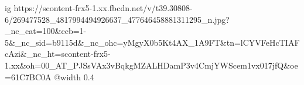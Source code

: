  
 
 
 
 

\ifcmt
  ig https://scontent-frx5-1.xx.fbcdn.net/v/t39.30808-6/269477528_4817994494926637_477646458881311295_n.jpg?_nc_cat=100&ccb=1-5&_nc_sid=b9115d&_nc_ohc=yMgyX0b5Kt4AX_1A9FT&tn=lCYVFeHcTIAFcAzi&_nc_ht=scontent-frx5-1.xx&oh=00_AT_PJSsVAx3vBqkgMZALHDamP3v4CmjYWScem1vx017jfQ&oe=61C7BC0A
  @width 0.4
\fi
